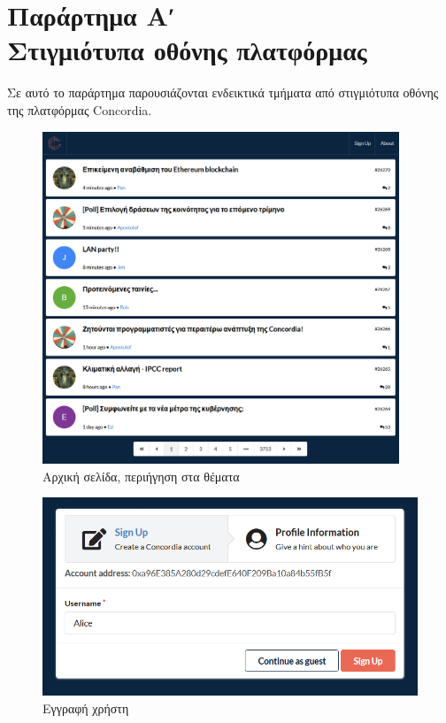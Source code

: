 \chapter*{Παράρτημα Αʹ\\[20pt]Στιγμιότυπα οθόνης πλατφόρμας}\label{appendix-a}

\captionsetup{labelformat=AppendixAFigures}
\setcounter{figure}{0}

Σε αυτό το παράρτημα παρουσιάζονται ενδεικτικά τμήματα από στιγμιότυπα οθόνης της πλατφόρμας Concordia.

\begin{figure}[H]
	\centering
	\includegraphics[width=0.95\textwidth]{assets/figures/appendix-a/screenshot-1-topics-screen}
	\caption{Αρχική σελίδα, περιήγηση στα θέματα}
\end{figure}

\begin{figure}[H]
	\centering
	\includegraphics[width=\textwidth]{assets/figures/appendix-a/screenshot-2-signup}
	\caption{Εγγραφή χρήστη}
\end{figure}

